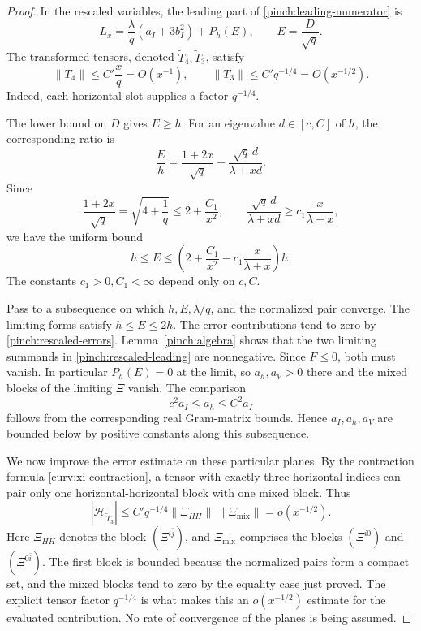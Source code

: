 \begin{proof}
In the rescaled variables, the leading part of
\eqref{pinch:leading-numerator} is
\begin{equation}\label{pinch:rescaled-leading}
 L_x=\frac{\lambda}{q}(a_I+3b_I^2)+P_h(E),
 \qquad E=\frac D{\sqrt q}.
\end{equation}
The transformed tensors, denoted \(\widetilde T_4,\widetilde T_3\),
satisfy
\begin{equation}\label{pinch:rescaled-errors}
 \|\widetilde T_4\|\le C'\frac{x}{q}=O(x^{-1}),
 \qquad
 \|\widetilde T_3\|\le C'q^{-1/4}=O(x^{-1/2}).
\end{equation}
Indeed, each horizontal slot supplies a factor \(q^{-1/4}\).

The lower bound on \(D\) gives \(E\ge h\).
For an eigenvalue \(d\in[c,C]\) of \(h\), the corresponding ratio is
\[
 \frac Eh=\frac{1+2x}{\sqrt q}
           -\frac{\sqrt q\,d}{\lambda+xd}.
\]
Since
\[
 \frac{1+2x}{\sqrt q}=\sqrt{4+\frac1q}
 \le2+\frac{C_1}{x^2},
 \qquad
 \frac{\sqrt q\,d}{\lambda+xd}
 \ge c_1\frac{x}{\lambda+x},
\]
we have the uniform bound
\begin{equation}\label{pinch:E-bounds}
 h\le E\le
 \left(2+\frac{C_1}{x^2}
          -c_1\frac{x}{\lambda+x}\right)h.
\end{equation}
The constants \(c_1>0,C_1<\infty\) depend only on \(c,C\).

Pass to a subsequence on which \(h,E,\lambda/q\), and the normalized
pair converge.
The limiting forms satisfy \(h\le E\le2h\).
The error contributions tend to zero by
\eqref{pinch:rescaled-errors}.
Lemma~\ref{pinch:algebra} shows that the two limiting summands in
\eqref{pinch:rescaled-leading} are nonnegative.
Since \(F\le0\), both must vanish.
In particular \(P_h(E)=0\) at the limit, so \(a_h,a_V>0\) there and
the mixed blocks of the limiting \(\Xi\) vanish.
The comparison
\[
 c^2a_I\le a_h\le C^2a_I
\]
follows from the corresponding real Gram-matrix bounds.
Hence \(a_I,a_h,a_V\) are bounded below by positive constants along
this subsequence.

We now improve the error estimate on these particular planes.
By the contraction formula \eqref{curv:xi-contraction}, a tensor with exactly three
horizontal indices can pair only one horizontal-horizontal block
with one mixed block.  Thus
\begin{equation}\label{pinch:vanishing-error}
 |\mathcal H_{\widetilde T_3}|
 \le C'q^{-1/4}\|\Xi_{HH}\|\,\|\Xi_{\mathrm{mix}}\|
 =o(x^{-1/2}).
\end{equation}
Here \(\Xi_{HH}\) denotes the block \((\Xi^{i\bar j})\), and
\(\Xi_{\mathrm{mix}}\) comprises the blocks
\((\Xi^{i\bar0})\) and \((\Xi^{0\bar i})\).
The first block is bounded because the normalized pairs form a
compact set, and the mixed blocks tend to zero by the equality case
just proved.
The explicit tensor factor \(q^{-1/4}\) is what makes this an
\(o(x^{-1/2})\) estimate for the evaluated contribution.
No rate of convergence of the planes is being assumed.


\end{proof}
